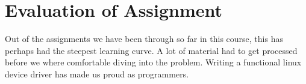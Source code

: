 \section{Evaluation of Assignment}
Out of the assignments we have been through so far in this course, this has perhaps had the steepest learning curve. A lot of material had to get processed before we where comfortable diving into the problem. Writing a functional linux device driver has made us proud as programmers. 
